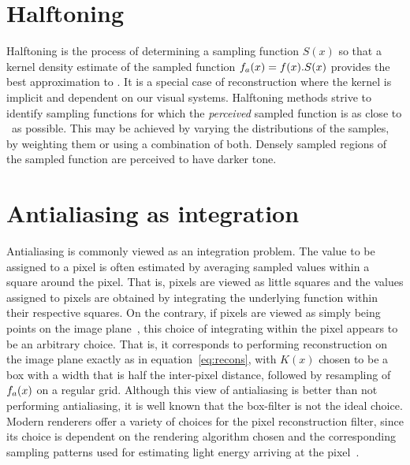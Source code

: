 \documentclass[11pt,fleqn]{book} %
\newcommand{\TBC} {}
\begin{document}
\TBC

\section{Halftoning}
Halftoning is the process of determining a sampling function $S(x)$ so that a kernel density estimate of the sampled function ${f}_a(x) = f(x).S(x)$ provides the best approximation to \ifn. It is a special case of reconstruction where the kernel is implicit and dependent on our visual systems. Halftoning methods strive to identify sampling functions for which the \textit{perceived} sampled function is as close to \ifn\ as possible. This may be achieved by varying the distributions of the samples, by weighting them or using a combination of both. Densely sampled regions of the sampled function are perceived to have darker tone. 

\TBC

\section{Antialiasing as integration}
Antialiasing is commonly viewed as an integration problem. The value to be assigned to a pixel is often estimated by averaging sampled values within a square around the pixel. That is, pixels are viewed as little squares and the values assigned to pixels are obtained by integrating the underlying function within their respective squares. On the contrary, if pixels are viewed as simply being points on the image plane~\cite{smith1995pixel}, this choice of integrating within the pixel appears to be an arbitrary choice. That is, it corresponds to performing reconstruction on the image plane exactly as in equation~\ref{eq:recons}, with $K(x)$ chosen to be a box with a width that is half the inter-pixel distance, followed by resampling of ${f}_a(x)$ on a regular grid. Although this view of antialiasing is better than not performing antialiasing, it is well known that the box-filter is not the ideal choice. Modern renderers offer a variety of choices for the pixel reconstruction filter, since its choice is dependent on the rendering algorithm chosen and the corresponding sampling patterns used for estimating light energy arriving at the pixel~\cite[section~7.6]{Pharr:2010:PBR:1854996}.

\TBC
\end{document}
